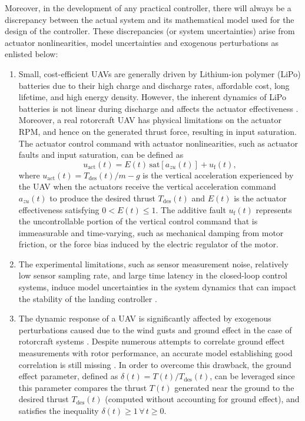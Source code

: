 \documentclass{IEEEtaes}
\begin{document}
Moreover, in the development of any practical controller, there will always be a discrepancy between the actual system and its mathematical model used for the design of the controller. These discrepancies (or system uncertainties) arise from actuator nonlinearities, model uncertainties and exogenous perturbations as enlisted below:
\begin{enumerate}
    \item[(a)] Small, cost-efficient UAVs are generally driven by Lithium-ion polymer (LiPo) batteries due to their high charge and discharge rates, affordable cost, long lifetime, and high energy density.
    However, the inherent dynamics of LiPo batteries is not linear during discharge and affects the actuator effectiveness \cite{podhradský2014}.
    Moreover, a real rotorcraft UAV has physical limitations on the actuator RPM, and hence on the generated thrust force, resulting in input saturation.
    The actuator control command with actuator nonlinearities, such as actuator faults and input saturation, can be defined as \cite{liu2023}
    \begin{equation} \label{actuator nonlinearities: equation}
        u_{\text{act}}(t) = E(t)\,\text{sat}[a_{zu}(t)] + u_{\text{f}}(t),
    \end{equation}
    where $u_{\text{act}}(t)=T_{\text{des}}(t)/m-g$ is the vertical acceleration experienced by the UAV when the actuators receive the vertical acceleration command $a_{zu}(t)$ to produce the desired thrust $T_{\text{des}}(t)$ and $E(t)$ is the actuator effectiveness satisfying $0<E(t)\leq 1$. The additive fault $u_{\text{f}}(t)$ represents the uncontrollable portion of the vertical control command that is immeasurable and time-varying, such as mechanical damping from motor friction, or the force bias induced by the electric regulator of the motor.
    \item[(b)] The experimental limitations, such as sensor measurement noise, relatively low sensor sampling rate, and large time latency in the closed-loop control systems, induce model uncertainties in the system dynamics that can impact the stability of the landing controller \cite{herisse2012}.
    \item[(c)] The dynamic response of a UAV is significantly affected by exogenous perturbations caused due to the wind gusts and ground effect in the case of rotorcraft systems \cite{nekoo2021}.
    Despite numerous attempts to correlate ground effect measurements with rotor performance, an accurate model establishing good correlation is still missing  \cite{sanchez-cuevas2017}.
    In order to overcome this drawback, the ground effect parameter, defined as $\delta(t)=T(t)/T_{\text{des}}(t)$, can be leveraged since this parameter compares the thrust $T(t)$ generated near the ground to the desired thrust $T_{\text{des}}(t)$ (computed without accounting for ground effect), and satisfies the inequality $\delta(t)\geq 1\,\forall\,t\geq 0$.
\end{enumerate}
\end{document}
